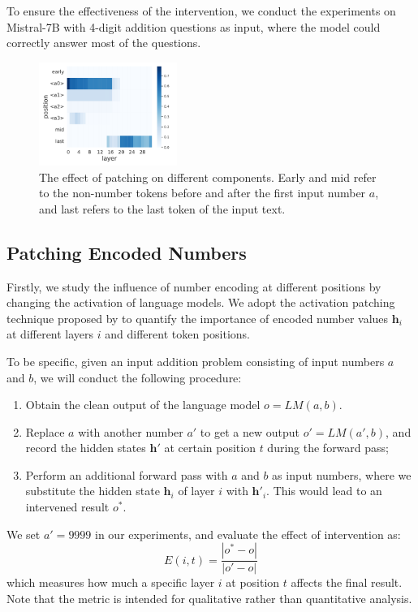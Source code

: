 \documentclass[11pt]{article}
\begin{document}
To ensure the effectiveness of the intervention, we conduct the experiments on Mistral-7B with 4-digit addition questions as input, where the model could correctly answer most of the questions.
\begin{figure}[htp]
    \centering
    \includegraphics[width=0.4\textwidth]{figures/intervene/patch/patch_effect.pdf}
    \caption{The effect of patching on different components. Early and mid refer to the non-number tokens before and after the first input number $a$, and last refers to the last token of the input text.}
    \label{fig:intervene_patch}
\end{figure}

\subsection{Patching Encoded Numbers}
\label{ssec:activation_patching}
Firstly, we study the influence of number encoding at different positions by changing the activation of language models.
We adopt the activation patching technique proposed by \citet{stolfo2023mechanistic} to quantify the importance of encoded number values $\mathbf{h}_i$ at different layers $i$ and different token positions.

To be specific, given an input addition problem consisting of input numbers $a$ and $b$, we will conduct the following procedure:
\begin{enumerate}
    \item Obtain the clean output of the language model $o = LM(a, b)$.
    \item Replace $a$ with another number $a'$ to get a new output $o' = LM(a', b)$, and record the hidden states $\mathbf{h}'$ at certain position $t$ during the forward pass;
    \item Perform an additional forward pass with $a$ and $b$ as input numbers, where we substitute the hidden state $\mathbf{h}_i$ of layer $i$ with $\mathbf{h}'_i$. This would lead to an intervened result $o^{*}$. 
\end{enumerate}
We set $a' = 9999$ in our experiments, and evaluate the effect of intervention as:
\begin{equation}
    E(i, t) = \frac{|o^{*}-o|}{|o'-o|}
\end{equation}
which measures how much a specific layer $i$ at position $t$ affects the final result.
Note that the metric is intended for qualitative rather than quantitative analysis.
\end{document}

